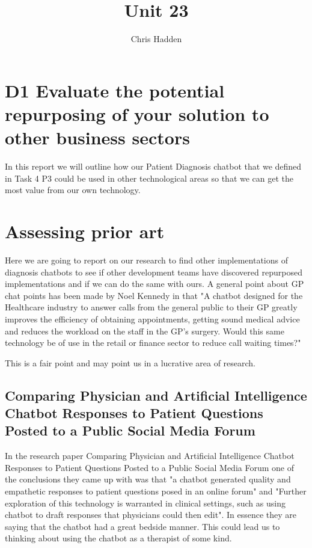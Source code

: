 \documentclass{article}
\title{Unit 23}
\author{Chris Hadden}
\date{}
\begin{document}
\maketitle
\section{D1 Evaluate the potential repurposing of your solution to other business sectors}
In this report we will outline how our Patient Diagnosis chatbot that we defined in Task 4 P3 could be used in other technological areas so that we can get the most value from our own technology.
\smallbreak
\section{Assessing prior art}
Here we are going to report on our research to find other implementations of diagnosis chatbots to see if other development teams have discovered repurposed implementations and if we can do the same with ours.
\smallbreak
A general point about GP chat points has been made by Noel Kennedy in that "A chatbot designed for the Healthcare industry to answer calls from the general public to
their GP greatly improves the efficiency of obtaining appointments, getting sound medical advice and reduces the workload on the staff in the GP’s surgery. Would this same technology be of use in the retail or finance sector to reduce call waiting times?" \cite{Noel}

This is a fair point and may point us in a lucrative area of research.
\smallbreak

\subsection{Comparing Physician and Artificial Intelligence Chatbot Responses to Patient Questions Posted to a Public Social Media Forum}
In the research paper Comparing Physician and Artificial Intelligence Chatbot Responses to Patient Questions Posted to a Public Social Media Forum\cite{bedside} one of the conclusions they came up with was that "a chatbot generated quality and empathetic responses to patient questions posed in an online forum" and "Further exploration of this technology is warranted in clinical settings, such as using chatbot to draft responses that physicians could then edit". In essence they are saying that the chatbot had a great bedside manner. This could lead us to thinking about using the chatbot as a therapist of some kind.
\end{document}
